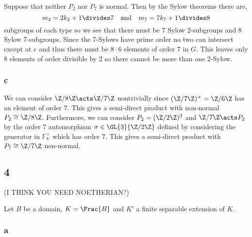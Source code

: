 \documentclass[12pt]{article}
\renewcommand{\F}{\mathbb{F}}
\begin{document}
Suppose that neither $P_2$ nor $P_7$ is normal. Then by the Sylow theorems there are,
\[ m_2 = 2 k_2 + 1 \divides 7 \quad \text{and} \quad m_7 = 7 k_7 + 1 \divides 8 \]
subgroups of each type so we see that there must be $7$ Sylow $2$-subgroups and $8$ Sylow $7$-subgroups. Since the $7$-Sylows have prime order no two can intersect except at $e$ and thus there must be $8 \cdot 6$ elements of order $7$ in $G$. This leaves only $8$ elements of order divisible by $2$ so there cannot be more than one $2$-Sylow. 

\subsubsection{c}

We can consider $\Z / 8 \Z \acts \Z / 7 \Z$ nontrivially since $(\Z / 7 \Z)^\times = \Z / 6 \Z$ has an element of order $7$. This gives a semi-direct product with non-normal $P_2 \cong \Z / 8 \Z$. Furthermore, we can consider $P_2 = (\Z/2\Z)^3$ and $\Z / 7 \Z \acts P_2$ by the order $7$ automorphism $\sigma \in \GL{3}{\Z/2\Z}$ defined by considering the generator in $\F_{8}^\times$ which has order $7$. This gives a semi-direct product with $P_7 \cong \Z / 7 \Z$ non-normal. 

\subsection{4}

(I THINK YOU NEED NOETHERIAN?)

Let $B$ be a domain, $K = \Frac{B}$ and $K'$ a finite separable extension of $K$.

\subsubsection{a}
\end{document}
